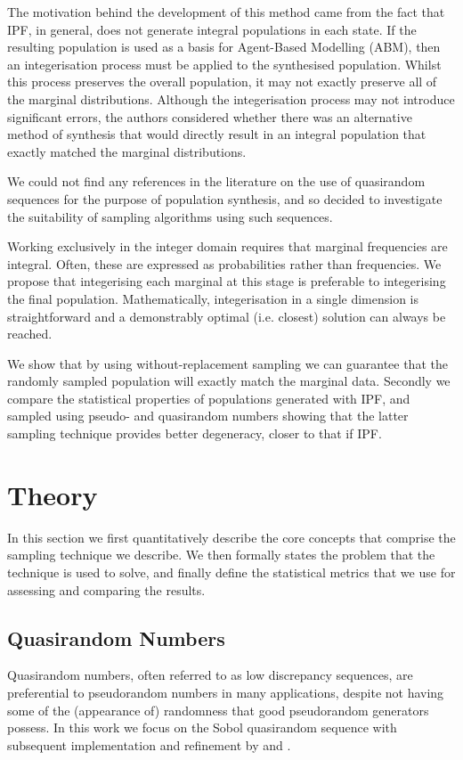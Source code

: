\documentclass{JASSS}
\begin{document}
The motivation behind the development of this method came from the fact
that IPF, in general, does not generate integral populations in each
state. If the resulting population is used as a basis for Agent-Based
Modelling (ABM), then an integerisation process must be applied to the
synthesised population. Whilst this process preserves the overall
population, it may not exactly preserve all of the marginal
distributions. Although the integerisation process may not introduce significant errors, the
authors considered whether there was an alternative method of synthesis
that would directly result in an integral population that exactly
matched the marginal distributions.

We could not find any references in the literature on the use of
quasirandom sequences for the purpose of population synthesis, and so
decided to investigate the suitability of sampling algorithms using such
sequences.

Working exclusively in the integer domain requires that marginal frequencies are integral. Often, these are expressed as probabilities rather than frequencies. We propose that integerising each marginal at this stage is preferable to integerising the final population. Mathematically, integerisation in a single dimension is straightforward and a demonstrably optimal (i.e. closest) solution can always be reached.    

We show that by using without-replacement sampling we can guarantee that the randomly sampled population will exactly match the marginal data. Secondly we compare the statistical properties of populations generated with IPF, and sampled using pseudo- and quasirandom numbers  showing that the latter sampling technique provides better degeneracy, closer to that if IPF.

\section{Theory}\label{theory}

In this section we first quantitatively describe the core concepts that comprise the sampling technique we describe. We then formally states the problem that the technique is used to solve, and finally define the statistical metrics that we use for assessing and comparing the results.  

\subsection{Quasirandom Numbers}\label{quasirandom-numbers}
Quasirandom numbers, often referred to as low discrepancy sequences, are
preferential to pseudorandom numbers in many applications, despite not
having some of the (appearance of) randomness that good pseudorandom
generators possess. In this work we focus on the Sobol quasirandom
sequence \citep{sobol_1967} with subsequent implementation and refinement by \cite{bratley_algorithm_1988} and \cite{joe_remark_2003}.
\end{document}

